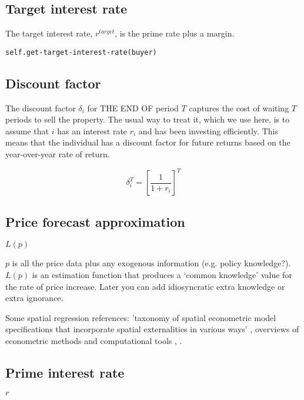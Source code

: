 \subsection{Target interest rate}\label{SS:targetr}

 The target interest rate, $r^{target}$, is the prime rate plus a margin. %

\begin{verbatim}
self.get-target-interest-rate(buyer)
\end{verbatim}



\subsection{Discount factor}\label{SS:discountfactor}

The discount factor $\delta_i$ for THE END OF period $T$ captures the cost of waiting $T$ periods to sell the property. The usual way to treat it, which we use here, is to assume that $i$ has an interest rate $r_i$ and has been investing efficiently. This means that  the individual has a discount factor for future returns based on the year-over-year rate of return. 

\[\delta^T_i=\left[\frac{1}{1+r_i}\right]^T\]



\subsection{Price forecast approximation} \label{SS:PriceForecast}
$L(p)$

$p$ is all the price data plus any exogenous information (e.g. policy knowledge?). $L(p)$ is an estimation function that produces a `common knowledge' value for the rate of price increase. Later you can add idiosyncratic extra knowledge or extra ignorance.

Some spatial regression references:
'taxonomy of spatial econometric model specifications that incorporate spatial externalities in various ways'
\cite{anselinSpatialExternalitiesSpatial2003},  
overviews of econometric methods and computational tools \cite{anselinModernSpatialEconometrics2014}, \cite{gelmanDataAnalysisUsing2006}.

\subsection{Prime interest rate}\label{SS:BankRate}
$r$

